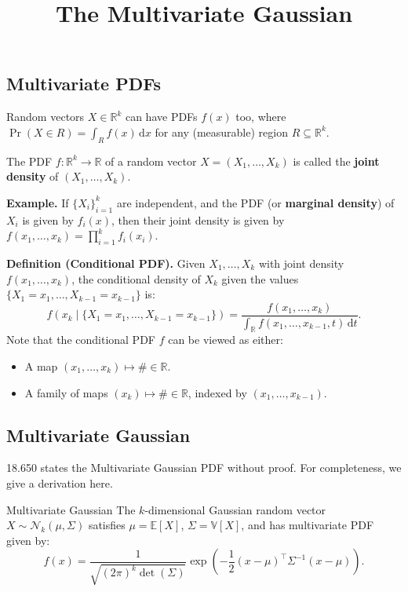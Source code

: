 \title{The Multivariate Gaussian}



\subsection{Multivariate PDFs}

Random vectors $X \in \mathbb{R}^{k}$ can have PDFs $f(x)$ too,
where $\Pr(X \in R) = \int_R f(x) \, \mathrm{d}x$ for
any (measurable) region $R \subseteq \mathbb{R}^k$.

The PDF $f: \mathbb{R}^k \to \mathbb{R}$ of a random vector $X = (X_1, \dots, X_k)$ is called
the \textbf{joint density} of $(X_1, \dots, X_k)$.

\textbf{Example.} If $\{X_i\}_{i = 1}^k$ are independent, and the PDF (or \textbf{marginal density})
of $X_i$ is given by $f_i(x)$, then their joint density is given by 
$f(x_1, \dots, x_k) = \prod_{i = 1}^k f_i(x_i)$.

\textbf{Definition (Conditional PDF).} Given $X_1, \dots, X_k$ with joint density $f(x_1, \dots, x_k)$,
the conditional density of $X_k$ given the values $\{X_1 = x_1, \dots, X_{k - 1} = x_{k - 1}\}$ is:
\[ f(x_k \mid \{X_1 = x_1, \dots, X_{k - 1} = x_{k - 1}\}) =
\frac{f(x_1, \dots, x_k)}{\int_{\mathbb{R}} f(x_1, \dots, x_{k - 1}, t) \, \mathrm{d}t}. \]
Note that the conditional PDF $f$ can be viewed as either:
\begin{itemize}
    \item A map $(x_1, \dots, x_k) \mapsto \# \in \mathbb{R}$.
    \item A family of maps $(x_k) \mapsto \# \in \mathbb{R}$, indexed by $(x_1, \dots, x_{k - 1})$.
\end{itemize}

\subsection{Multivariate Gaussian}

18.650 states the Multivariate Gaussian PDF without proof.
For completeness, we give a derivation here.

\begin{theorem}{Multivariate Gaussian}
    The $k$-dimensional Gaussian random vector
    $X \sim \mathcal{N}_k(\mu, \Sigma)$ satisfies $\mu = \mathbb{E}[X]$,
    $\Sigma = \mathbb{V}[X]$, and has multivariate PDF given by:
    \[ f(x) = \frac{1}{\sqrt{(2\pi)^k \det(\Sigma)}}
    \exp\left(-\frac{1}{2}(x - \mu)^{\top}\Sigma^{-1}(x - \mu)\right). \]
\end{theorem}

